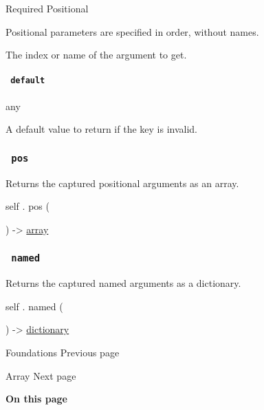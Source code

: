 {Required} {{ Positional }}

\label{definitions-at-key-positional-tooltip}
Positional parameters are specified in order, without names.

The index or name of the argument to get.

\paragraph{\texorpdfstring{\texttt{\ default\ }}{ default }}\label{definitions-at-default}

{ any }

A default value to return if the key is invalid.

\subsubsection{\texorpdfstring{\texttt{\ pos\ }}{ pos }}\label{definitions-pos}

Returns the captured positional arguments as an array.

self { . } { pos } (

) -\textgreater{} \href{/docs/reference/foundations/array/}{array}

\subsubsection{\texorpdfstring{\texttt{\ named\ }}{ named }}\label{definitions-named}

Returns the captured named arguments as a dictionary.

self { . } { named } (

) -\textgreater{}
\href{/docs/reference/foundations/dictionary/}{dictionary}

\href{/docs/reference/foundations/}{\pandocbounded{}}

{ Foundations } { Previous page }

\href{/docs/reference/foundations/array/}{\pandocbounded{}}

{ Array } { Next page }

\textbf{On this page}

